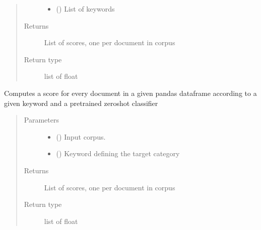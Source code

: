 \documentclass[letterpaper,10pt,english]{sphinxmanual}
\begin{document}
\begin{fulllineitems}
\begin{fulllineitems}
\begin{quote}
\begin{description}
\begin{itemize}
\item {} 
\sphinxAtStartPar
{} () \textendash{} List of keywords

\end{itemize}

\item[{Returns}] \leavevmode
\sphinxAtStartPar
{} \textendash{} List of scores, one per document in corpus

\item[{Return type}] \leavevmode
\sphinxAtStartPar
list of float

\end{description}\end{quote}

\end{fulllineitems}


\begin{fulllineitems}
\label{\detokenize{dc_preprocessor:src.domain_classifier.preprocessor.CorpusProcessor.score_docs_by_zeroshot}}
\sphinxAtStartPar
Computes a score for every document in a given pandas dataframe
according to a given keyword and a pre\sphinxhyphen{}trained zero\sphinxhyphen{}shot classifier
\begin{quote}\begin{description}
\item[{Parameters}] \leavevmode\begin{itemize}
\item {} 
\sphinxAtStartPar
{} () \textendash{} Input corpus.

\item {} 
\sphinxAtStartPar
{} () \textendash{} Keyword defining the target category

\end{itemize}

\item[{Returns}] \leavevmode
\sphinxAtStartPar
{} \textendash{} List of scores, one per document in corpus

\item[{Return type}] \leavevmode
\sphinxAtStartPar
list of float

\end{description}\end{quote}

\end{fulllineitems}


\end{fulllineitems}
\end{document}

